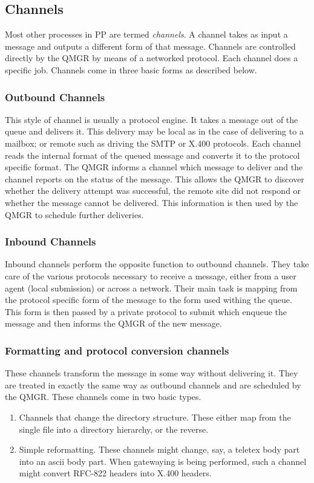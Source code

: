 \subsection{Channels}

Most other processes in PP are termed {\em channels}. A channel takes
as input a message and outputs a different form of that message.
Channels are controlled directly by the QMGR by means of a networked
protocol. Each channel does a specific job. Channels come in three
basic forms as described below.

\subsubsection{Outbound Channels}
This style of channel is usually a protocol engine. It takes a message
out of the queue and delivers it. This delivery may be local as in the
case of delivering to a mailbox; or remote such as driving the
SMTP\cite{SMTP} or X.400 protocols. Each channel reads the internal
format of the queued message and converts it to the protocol specific
format. The QMGR informs a channel which message to deliver and the
channel reports on the status of the message. This allows the QMGR to
discover whether the delivery attempt was successful, the remote site
did not respond or whether the message cannot be delivered. This
information is then used by the QMGR to schedule further deliveries.

\subsubsection{Inbound Channels}
Inbound channels perform the opposite function to outbound channels.
They take care of the various protocols necessary to receive a
message, either from a user agent (local submission) or across a
network. Their main task is mapping from the protocol specific form of
the message to the form used withing the queue. This form is then
passed by a private protocol to submit which enqueue the message and
then informs the QMGR of the new message.

\subsubsection{Formatting and protocol conversion channels}
These channels transform the message in some way without delivering
it. They are treated in exactly the same way as outbound channels and
are scheduled by the QMGR. These channels come in two basic types.
\begin{enumerate}
\item	Channels that change the directory structure. These either map
from the single file into a directory hierarchy, or the reverse.

\item	Simple reformatting. These channels might change, say, a teletex
body part into an ascii body part. When gatewaying is being performed,
such a channel might convert RFC-822 headers into X.400 headers.

\end{enumerate}

